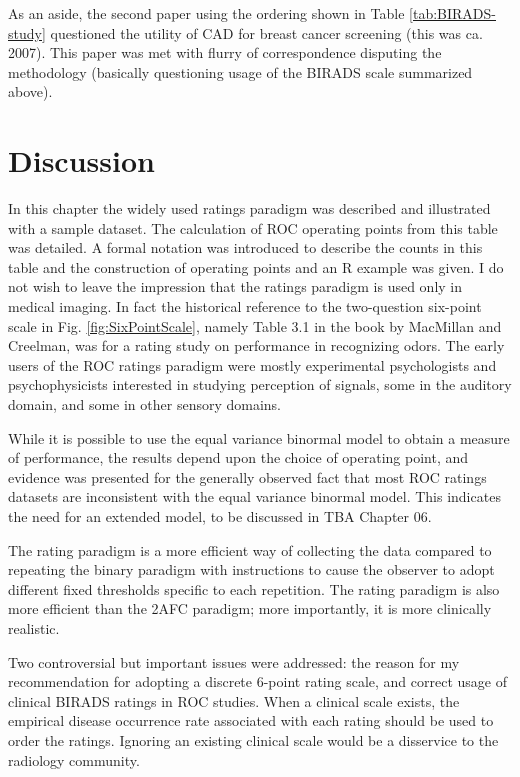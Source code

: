 \documentclass[
]{book}
\begin{document}
As an aside, the second paper \citep{fenton2007influence} using the ordering shown in Table \ref{tab:BIRADS-study} questioned the utility of CAD for breast cancer screening (this was ca. 2007). This paper was met with flurry of correspondence disputing the methodology (basically questioning usage of the BIRADS scale summarized above).

\hypertarget{ratings-paradigm-discussion}{%
\section{Discussion}\label{ratings-paradigm-discussion}}

In this chapter the widely used ratings paradigm was described and illustrated with a sample dataset. The calculation of ROC operating points from this table was detailed. A formal notation was introduced to describe the counts in this table and the construction of operating points and an R example was given. I do not wish to leave the impression that the ratings paradigm is used only in medical imaging. In fact the historical reference \citep{macmillan2004detection} to the two-question six-point scale in Fig. \ref{fig:SixPointScale}, namely Table 3.1 in the book by MacMillan and Creelman, was for a rating study on performance in recognizing odors. The early users of the ROC ratings paradigm were mostly experimental psychologists and psychophysicists interested in studying perception of signals, some in the auditory domain, and some in other sensory domains.

While it is possible to use the equal variance binormal model to obtain a measure of performance, the results depend upon the choice of operating point, and evidence was presented for the generally observed fact that most ROC ratings datasets are inconsistent with the equal variance binormal model. This indicates the need for an extended model, to be discussed in TBA Chapter 06.

The rating paradigm is a more efficient way of collecting the data compared to repeating the binary paradigm with instructions to cause the observer to adopt different fixed thresholds specific to each repetition. The rating paradigm is also more efficient than the 2AFC paradigm; more importantly, it is more clinically realistic.

Two controversial but important issues were addressed: the reason for my recommendation for adopting a discrete 6-point rating scale, and correct usage of clinical BIRADS ratings in ROC studies. When a clinical scale exists, the empirical disease occurrence rate associated with each rating should be used to order the ratings. Ignoring an existing clinical scale would be a disservice to the radiology community.
\end{document}
